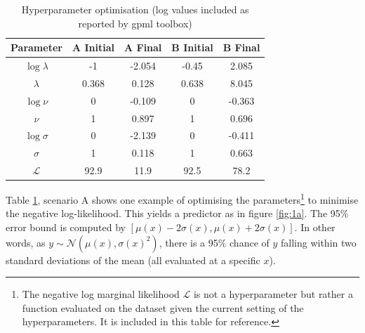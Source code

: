 \documentclass[]{article}
\newcommand{\Ncal}{\mathcal{N}}
\newcommand{\Lcal}{\mathcal{L}}
\begin{document}
\begin{table}[!h]
\centering
\begin{tabular}{c | c c | c c}
	\textbf{Parameter} & \textbf{A Initial} & \textbf{A Final} & \textbf{B Initial} & \textbf{B Final} \\ \hline
	$\log \lambda$           & -1                 & -2.054           & -0.45              & 2.085            \\
	$\lambda$                & 0.368              & 0.128            & 0.638              & 8.045            \\
	$\log \nu$         & 0                  & -0.109           & 0                  & -0.363           \\
	$\nu$              & 1                  & 0.897            & 1                  & 0.696            \\
	$\log \sigma$      & 0                  & -2.139           & 0                  & -0.411   \\
	$\sigma$           & 1                  & 0.118            & 1                  & 0.663    \\ \hline
	$\Lcal$            & 92.9               & 11.9             & 92.5               & 78.2  
\end{tabular}
\caption{Hyperparameter optimisation (log values included as reported by gpml toolbox)}
\label{tab:hyp-opt}
\end{table}

Table \ref{tab:hyp-opt}, scenario A shows one example of optimising the parameters\footnote{The negative log marginal likelihood $\Lcal$ is not a hyperparameter but rather a function evaluated on the dataset given the current setting of the hyperparameters. It is included in this table for reference.} to minimise the negative log-likelihood. This yields a predictor as in figure \ref{fig:1a}. The 95\% error bound is computed by $[\mu(x) - 2\sigma(x), \mu(x) + 2\sigma(x)]$. In other words, as $y \sim \Ncal(\mu(x), \sigma(x)^2)$, there is a 95\% chance of $y$ falling within two standard deviations of the mean (all evaluated at a specific $x$).
\end{document}

